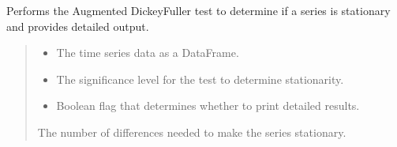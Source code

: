\documentclass[letterpaper,10pt,english]{sphinxmanual}
\begin{document}

\begin{fulllineitems}
\label{\detokenize{docs/time_series_analysis:time_series_analysis.adf_test}}
\pysigstartsignatures
{}
\pysigstopsignatures
\sphinxAtStartPar
Performs the Augmented Dickey\sphinxhyphen{}Fuller test to determine if a series is stationary and provides detailed output.
\begin{quote}\begin{description}
\begin{itemize}
\item {} 
\sphinxAtStartPar
{} \textendash{} The time series data as a DataFrame.

\item {} 
\sphinxAtStartPar
{} \textendash{} The significance level for the test to determine stationarity.

\item {} 
\sphinxAtStartPar
{} \textendash{} Boolean flag that determines whether to print detailed results.

\end{itemize}

\sphinxAtStartPar
The number of differences needed to make the series stationary.

\end{description}\end{quote}

\end{fulllineitems}

\end{document}
